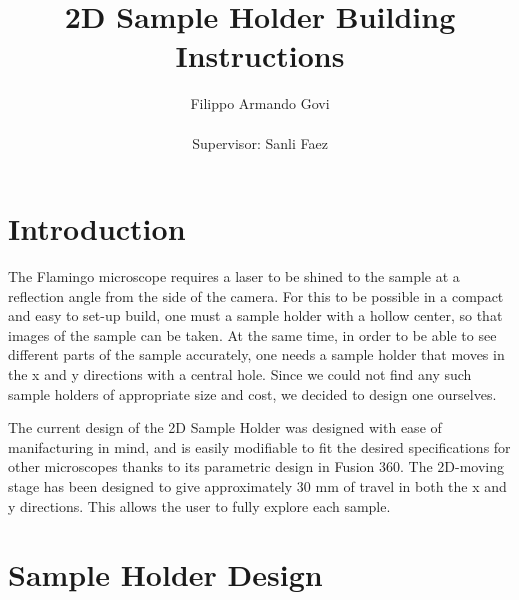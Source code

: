 \documentclass[runningheads]{llncs}
\begin{document}
%
\title{2D Sample Holder Building Instructions}
%
%
\author{Filippo Armando Govi  \\~\\ Supervisor: Sanli Faez }

%
\maketitle              %
%
%
%
%
\doublespacing

\section*{Introduction}

The Flamingo microscope requires a laser to be shined to the sample at a reflection angle from the side of the camera. For this to be possible in a compact and easy to set-up build, one must a sample holder with a hollow center, so that images of the sample can be taken. At the same time, in order to be able to see different parts of the sample accurately, one needs a sample holder that moves in the x and y directions with a central hole. Since we could not find any such sample holders of appropriate size and cost, we decided to design one ourselves. 

The current design of the 2D Sample Holder was designed with ease of manifacturing in mind, and is easily modifiable to fit the desired specifications for other microscopes thanks to its parametric design in Fusion 360. The 2D-moving stage has been designed to give approximately 30 mm of travel in both the x and y directions. This allows the user to fully explore each sample.

\section*{Sample Holder Design}
\end{document}
